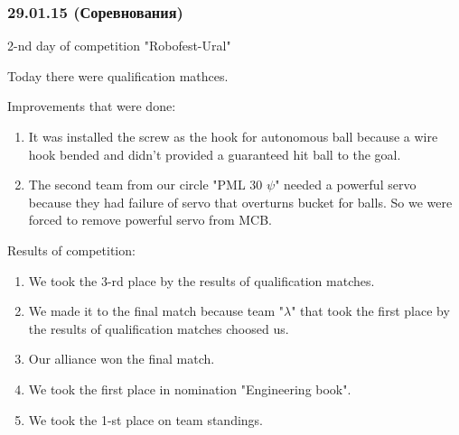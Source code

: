 \subsubsection{29.01.15 (Соревнования)}
\begin{center}
	2-nd day of competition "Robofest-Ural"
\end{center}
Today there were qualification mathces.
\newline 

Improvements that were done:
\begin{enumerate}
	\item It was installed the screw as the hook for autonomous ball because a wire hook bended and didn't provided a guaranteed hit ball to the goal.
	
	\item The second team from our circle "PML 30 ${\psi}$" needed a powerful servo because they had failure of servo that overturns bucket for balls. So we were forced to remove powerful servo from MCB.
	
\end{enumerate}

Results of competition:
\begin{enumerate}
	\item We took the 3-rd place by the results of qualification matches.
	
	\item We made it to the final match because team "${\lambda}$" that took the first place by the results of qualification matches choosed us.
	
	\item Our alliance won the final match.
	
	\item We took the first place in nomination "Engineering book".
	
	\item We took the 1-st place on team standings.
\end{enumerate}

